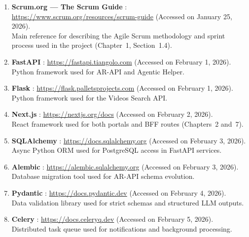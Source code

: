 \begin{enumerate}[leftmargin=0pt]
  \item \label{web:scrumorg} \textbf{Scrum.org --- The Scrum Guide} :
        \url{https://www.scrum.org/resources/scrum-guide} (Accessed on January 25, 2026).\\
        Main reference for describing the Agile Scrum methodology and sprint process used in the
        project (Chapter~1, Section~1.4).

  \item \label{web:fastapi} \textbf{FastAPI} :
        \url{https://fastapi.tiangolo.com} (Accessed on February 1, 2026).\\
        Python framework used for AR-API and Agentic Helper.

  \item \label{web:flask} \textbf{Flask} :
        \url{https://flask.palletsprojects.com} (Accessed on February 1, 2026).\\
        Python framework used for the Videos Search API.

  \item \label{web:nextjs} \textbf{Next.js} :
        \url{https://nextjs.org/docs} (Accessed on February 2, 2026).\\
        React framework used for both portals and BFF routes (Chapters~2 and~7).

  \item \label{web:sqlalchemy} \textbf{SQLAlchemy} :
        \url{https://docs.sqlalchemy.org} (Accessed on February 3, 2026).\\
        Async Python ORM used for PostgreSQL access in FastAPI services.

  \item \label{web:alembic} \textbf{Alembic} :
        \url{https://alembic.sqlalchemy.org} (Accessed on February 3, 2026).\\
        Database migration tool used for AR-API schema evolution.

  \item \label{web:pydantic} \textbf{Pydantic} :
        \url{https://docs.pydantic.dev} (Accessed on February 4, 2026).\\
        Data validation library used for strict schemas and structured LLM outputs.

  \item \label{web:celery} \textbf{Celery} :
        \url{https://docs.celeryq.dev} (Accessed on February 5, 2026).\\
        Distributed task queue used for notifications and background processing.


\end{enumerate}
